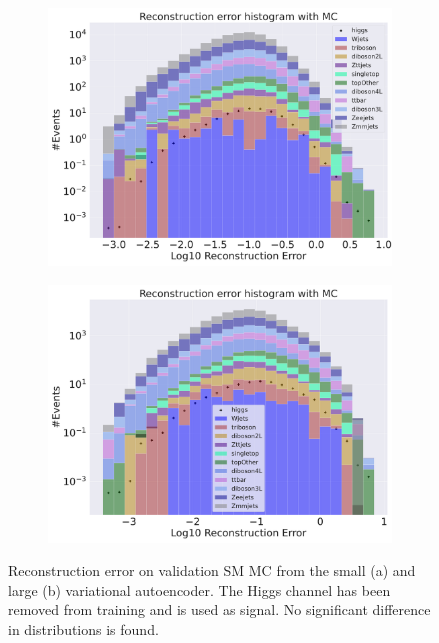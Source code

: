 \begin{figure}[!htb]
    \centering
    \begin{subfigure}{.45\textwidth}
        \includegraphics[width=\textwidth]{Figures/VAE_testing/small/b_data_recon_big_rm3_feats_sig_Higgs.pdf}
        \caption{}
        \label{fig:vae_small_higgs}
    \end{subfigure}
    \hfill 
    \begin{subfigure}{.45\textwidth}
        \includegraphics[width=\textwidth]{Figures/VAE_testing/big/b_data_recon_big_rm3_feats_sig_higgs.pdf}
        \caption{ }
        \label{fig:vae_big_higgs}
    \end{subfigure}
    \hfill  
    \caption[VAE | Reconstruction error using Higgs channel as signal]{Reconstruction error on validation SM MC from the small (a) and large (b) variational autoencoder. The Higgs channel has been removed from training and 
    is used as signal. No significant difference in distributions is found. }
    \label{fig:vae_big_channel_1}
\end{figure}

